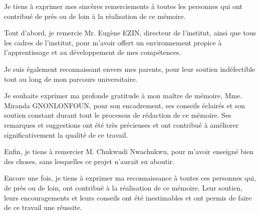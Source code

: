 \remerciements

Je tiens à exprimer mes sincères remerciements à toutes les personnes qui ont contribué de près ou de loin à la réalisation de ce mémoire. 

Tout d'abord, je remercie Mr. Eugène EZIN, directeur de l'institut, ainsi que tous les cadres de l'institut, pour m'avoir offert un environnement propice à l'apprentissage et au développement de mes compétences. 

Je suis également reconnaissant envers mes parents, pour leur soutien indéfectible tout au long de mon parcours universitaire.

Je souhaite exprimer ma profonde gratitude à mon maître de mémoire, Mme. Miranda GNONLONFOUN, pour son encadrement, ses conseils éclairés et son soutien constant durant tout le processus de rédaction de ce mémoire. 
Ses remarques et suggestions ont été très précieuses et ont contribué à améliorer significativement la qualité de ce travail.

Enfin, je tiens à remercier M. Chukwudi Nwachukwu, pour m'avoir enseigné bien des choses, sans lesquelles ce projet n'aurait su aboutir.

Encore une fois, je tiens à exprimer ma reconnaissance à toutes ces personnes qui, de près ou de loin, ont contribué à la réalisation de ce mémoire. Leur soutien, leurs encouragements et leurs conseils ont été inestimables et ont permis de faire de ce travail une réussite.